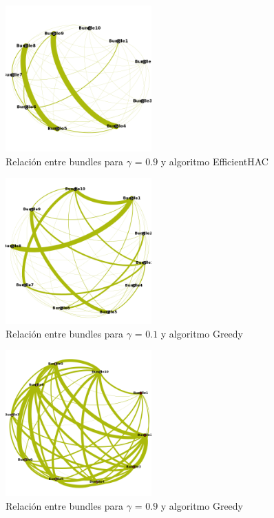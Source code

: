 \begin{figure}[H]
  \centering
    \includegraphics[width=0.5\textwidth]{resultados/papers/intra_inter/effhac09.png}
  \caption{Relación entre bundles para $\gamma$ = $0.9$ y algoritmo EfficientHAC}
  \label{res:img-papers-gamma09-effhac}
\end{figure}

\begin{figure}[H]
  \centering
    \includegraphics[width=0.5\textwidth]{resultados/papers/intra_inter/greedy01.png}
  \caption{Relación entre bundles para $\gamma$ = $0.1$ y algoritmo Greedy}
  \label{res:img-papers-gamma01-greedy}
\end{figure}

\begin{figure}[H]
  \centering
    \includegraphics[width=0.5\textwidth]{resultados/papers/intra_inter/greedy09.png}
  \caption{Relación entre bundles para $\gamma$ = $0.9$ y algoritmo Greedy}
  \label{res:img-papers-gamma09-greedy}
\end{figure}

